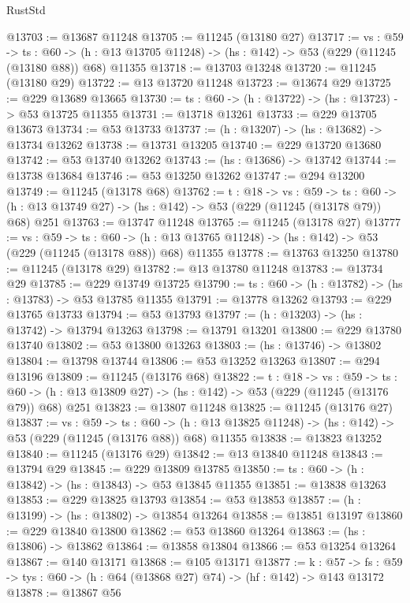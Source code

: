 \begin{lexlean}{RustStd}
\begin{coremodule}
@13703 := @13687 @11248
@13705 := @11245 (@13180 @27)
@13717 := {vs : @59} ->
  {ts : @60} ->
  (h : @13 @13705 @11248) -> (hs : @142) -> @53 (@229 (@11245 (@13180 @88)) @68) @11355
@13718 := @13703 @13248
@13720 := @11245 (@13180 @29)
@13722 := @13 @13720 @11248
@13723 := @13674 @29
@13725 := @229 @13689 @13665
@13730 := {ts : @60} -> (h : @13722) -> (hs : @13723) -> @53 @13725 @11355
@13731 := @13718 @13261
@13733 := @229 @13705 @13673
@13734 := @53 @13733
@13737 := (h : @13207) -> (hs : @13682) -> @13734 @13262
@13738 := @13731 @13205
@13740 := @229 @13720 @13680
@13742 := @53 @13740 @13262
@13743 := (hs : @13686) -> @13742
@13744 := @13738 @13684
@13746 := @53 @13250 @13262
@13747 := @294 @13200
@13749 := @11245 (@13178 @68)
@13762 := {t : @18} ->
  {vs : @59} ->
  {ts : @60} -> (h : @13 @13749 @27) -> (hs : @142) -> @53 (@229 (@11245 (@13178 @79)) @68) @251
@13763 := @13747 @11248
@13765 := @11245 (@13178 @27)
@13777 := {vs : @59} ->
  {ts : @60} ->
  (h : @13 @13765 @11248) -> (hs : @142) -> @53 (@229 (@11245 (@13178 @88)) @68) @11355
@13778 := @13763 @13250
@13780 := @11245 (@13178 @29)
@13782 := @13 @13780 @11248
@13783 := @13734 @29
@13785 := @229 @13749 @13725
@13790 := {ts : @60} -> (h : @13782) -> (hs : @13783) -> @53 @13785 @11355
@13791 := @13778 @13262
@13793 := @229 @13765 @13733
@13794 := @53 @13793
@13797 := (h : @13203) -> (hs : @13742) -> @13794 @13263
@13798 := @13791 @13201
@13800 := @229 @13780 @13740
@13802 := @53 @13800 @13263
@13803 := (hs : @13746) -> @13802
@13804 := @13798 @13744
@13806 := @53 @13252 @13263
@13807 := @294 @13196
@13809 := @11245 (@13176 @68)
@13822 := {t : @18} ->
  {vs : @59} ->
  {ts : @60} -> (h : @13 @13809 @27) -> (hs : @142) -> @53 (@229 (@11245 (@13176 @79)) @68) @251
@13823 := @13807 @11248
@13825 := @11245 (@13176 @27)
@13837 := {vs : @59} ->
  {ts : @60} ->
  (h : @13 @13825 @11248) -> (hs : @142) -> @53 (@229 (@11245 (@13176 @88)) @68) @11355
@13838 := @13823 @13252
@13840 := @11245 (@13176 @29)
@13842 := @13 @13840 @11248
@13843 := @13794 @29
@13845 := @229 @13809 @13785
@13850 := {ts : @60} -> (h : @13842) -> (hs : @13843) -> @53 @13845 @11355
@13851 := @13838 @13263
@13853 := @229 @13825 @13793
@13854 := @53 @13853
@13857 := (h : @13199) -> (hs : @13802) -> @13854 @13264
@13858 := @13851 @13197
@13860 := @229 @13840 @13800
@13862 := @53 @13860 @13264
@13863 := (hs : @13806) -> @13862
@13864 := @13858 @13804
@13866 := @53 @13254 @13264
@13867 := @140 @13171
@13868 := @105 @13171
@13877 := {k : @57} ->
  {fs : @59} -> {tys : @60} -> (h : @64 (@13868 @27) @74) -> (hf : @142) -> @143 @13172
@13878 := @13867 @56

\end{coremodule}
\end{lexlean}
